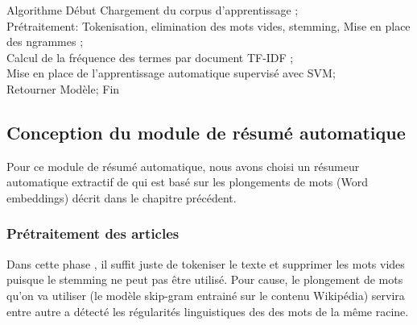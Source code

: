 \begin{algorithm}
\begin{algorithmic}[1]

\STATE Algorithme
\STATE Début
\STATE Chargement du corpus d'apprentissage ;\\
\STATE Pr\'etraitement: Tokenisation, elimination des mots vides, stemming, Mise en place des ngrammes ;\\
\STATE Calcul de la fréquence des termes par document TF-IDF ;\\
\STATE Mise en place de l'apprentissage automatique supervisé avec SVM;\\
\STATE \quad Retourner Modèle;
\STATE Fin

\end{algorithmic}
\end{algorithm}


\subsection{Conception du module de résumé automatique}
Pour ce module de résumé automatique, nous avons choisi un résumeur automatique extractif de \cite{ffff} qui est basé sur les plongements de mots (Word embeddings) décrit dans le chapitre précédent.

\subsubsection{Prétraitement des articles}
Dans cette phase , il suffit juste de tokeniser le texte et supprimer les mots vides puisque le stemming ne peut pas être utilisé. Pour cause, le plongement de mots qu'on va utiliser (le modèle skip-gram entrainé sur le contenu Wikipédia) servira entre autre a détecté les régularités linguistiques des des mots de la même racine.



